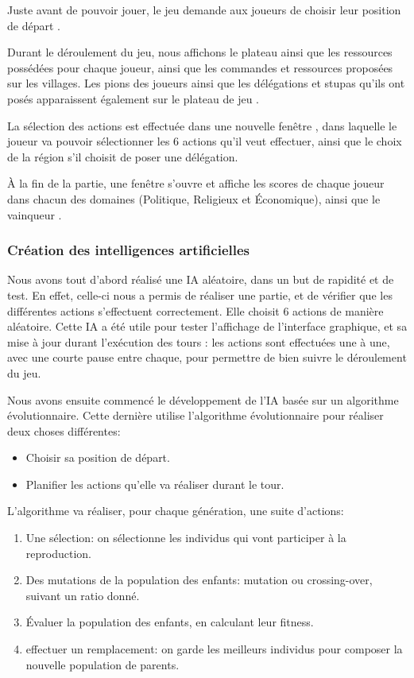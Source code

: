 Juste avant de pouvoir jouer, le jeu demande aux joueurs de choisir leur position de départ .

Durant le déroulement du jeu, nous affichons le plateau ainsi que les ressources
possédées pour chaque joueur, ainsi que les commandes et ressources proposées sur
les villages. Les pions des joueurs ainsi que les délégations et stupas qu'ils ont posés
apparaissent également sur le plateau de jeu .

La sélection des actions est effectuée dans une nouvelle fenêtre , dans laquelle
le joueur va pouvoir sélectionner les 6 actions qu'il veut effectuer, ainsi que
le choix de la région s'il choisit de poser une délégation.

À la fin de la partie, une fenêtre s'ouvre et affiche les scores de chaque joueur
dans chacun des domaines (Politique, Religieux et Économique), ainsi que le vainqueur .

\subsubsection{Création des intelligences artificielles}

Nous avons tout d'abord réalisé une IA aléatoire, dans un but de rapidité et de test.
En effet, celle-ci nous a permis de réaliser une partie, et de vérifier que les différentes actions 
s'effectuent correctement. Elle choisit 6 actions de manière aléatoire.
Cette IA a été utile pour tester l'affichage de l'interface graphique, et sa
mise à jour durant l'exécution des tours : les actions sont effectuées une
à une, avec une courte pause entre chaque, pour permettre de bien suivre le déroulement du jeu.

Nous avons ensuite commencé le développement de l'IA basée sur un algorithme évolutionnaire.
Cette dernière utilise l'algorithme évolutionnaire pour réaliser deux choses différentes:
\begin{itemize}
	\item Choisir sa position de départ.
	\item Planifier les actions qu'elle va réaliser durant le tour.
\end{itemize}

L'algorithme va réaliser, pour chaque génération, une suite d'actions:
\begin{enumerate}
	\item Une sélection: on sélectionne les individus qui vont participer à la reproduction.
	\item Des mutations de la population des enfants: mutation ou crossing-over, suivant un ratio donné.
	\item Évaluer la population des enfants, en calculant leur fitness.
	\item effectuer un remplacement: on garde les meilleurs individus pour composer la nouvelle population de parents.
\end{enumerate}



